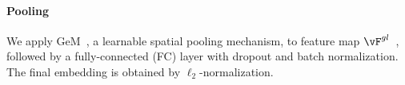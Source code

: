 
\paragraph{Pooling}

We apply GeM~\cite{Radenovic01}, a learnable spatial pooling mechanism, to feature map $\vF^{gl}$~, followed by a fully-connected (FC) layer with dropout and batch normalization. The final embedding is obtained by $\ell_2$-normalization.
